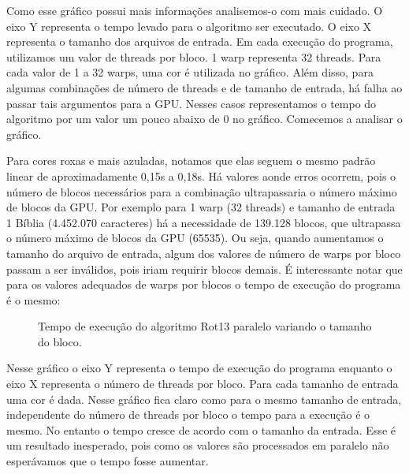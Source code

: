\documentclass[12pt]{article}
\begin{document}
Como esse gráfico possui mais informações analisemos-o com mais cuidado.
O eixo Y representa o tempo levado para o algoritmo ser executado.
O eixo X representa o tamanho dos arquivos de entrada. Em cada execução
do programa, utilizamos um valor de threads por bloco. 1 warp 
representa 32 threads. Para cada valor de 1 a 32 warps, uma cor é
utilizada no gráfico. Além disso, para algumas combinações de número de
threads e de tamanho de entrada, há falha ao passar tais argumentos
para a GPU. Nesses casos representamos o tempo do algoritmo por um valor
um pouco abaixo de 0 no gráfico. Comecemos a analisar o gráfico.

Para cores roxas e mais azuladas, notamos que elas seguem o mesmo padrão
linear de aproximadamente 0,15s a 0,18s. Há valores aonde erros
ocorrem, pois o número de blocos necessários para a combinação
ultrapassaria o número máximo de blocos da GPU. Por exemplo para 1 warp
(32 threads) e tamanho de entrada 1 Bíblia (4.452.070 caracteres) há a
necessidade de 139.128 blocos, que ultrapassa o número máximo de blocos
da GPU (65535). Ou seja, quando aumentamos o tamanho do arquivo de
entrada, algum dos valores de número de warps por bloco passam a ser
inválidos, pois iriam requirir blocos demais. É interessante notar que
para os valores adequados de warps por blocos o tempo de execução do
programa é o mesmo:

\begin{figure}[H]
    \caption{Tempo de execução do algoritmo Rot13 paralelo variando o
    tamanho do bloco.}
\end{figure}

Nesse gráfico o eixo Y representa o tempo de execução do programa
enquanto o eixo X representa o número de threads por bloco. Para cada
tamanho de entrada uma cor é dada. Nesse gráfico fica claro como para o
mesmo tamanho de entrada, independente do número de threads por bloco o
tempo para a execução é o mesmo. No entanto o tempo cresce de acordo com
o tamanho da entrada. Esse é um resultado inesperado, pois como os 
valores são processados em paralelo não esperávamos que o tempo fosse
aumentar.
\end{document}
